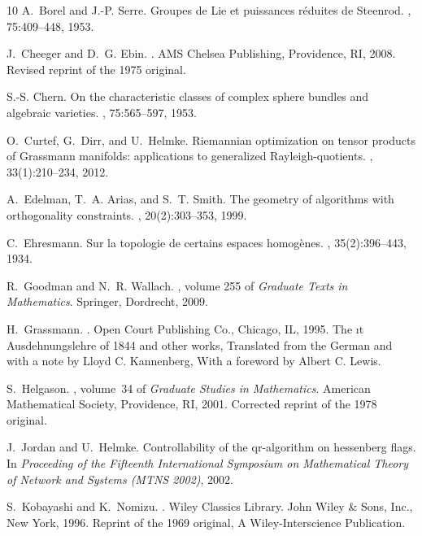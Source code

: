\documentclass[11pt,reqno]{amsart}%
\theoremstyle{definition}
\theoremstyle{remark}
\begin{document}
\begin{thebibliography}{10}
A.~Borel and J.-P. Serre.
\newblock Groupes de {L}ie et puissances r\'{e}duites de {S}teenrod.
, 75:409--448, 1953.

J.~Cheeger and D.~G. Ebin.
.
\newblock AMS Chelsea Publishing, Providence, RI, 2008.
\newblock Revised reprint of the 1975 original.

S.-S. Chern.
\newblock On the characteristic classes of complex sphere bundles and algebraic
  varieties.
, 75:565--597, 1953.

O.~Curtef, G.~Dirr, and U.~Helmke.
\newblock Riemannian optimization on tensor products of {G}rassmann manifolds:
  applications to generalized {R}ayleigh-quotients.
, 33(1):210--234, 2012.

A.~Edelman, T.~A. Arias, and S.~T. Smith.
\newblock The geometry of algorithms with orthogonality constraints.
, 20(2):303--353, 1999.

C.~Ehresmann.
\newblock Sur la topologie de certains espaces homog\`enes.
, 35(2):396--443, 1934.

R.~Goodman and N.~R. Wallach.
, volume 255 of {\em
  Graduate Texts in Mathematics}.
\newblock Springer, Dordrecht, 2009.

H.~Grassmann.
.
\newblock Open Court Publishing Co., Chicago, IL, 1995.
\newblock The {{\i}t Ausdehnungslehre} of 1844 and other works, Translated from
  the German and with a note by Lloyd C. Kannenberg, With a foreword by Albert
  C. Lewis.

S.~Helgason.
,
  volume~34 of {\em Graduate Studies in Mathematics}.
\newblock American Mathematical Society, Providence, RI, 2001.
\newblock Corrected reprint of the 1978 original.

J.~Jordan and U.~Helmke.
\newblock Controllability of the qr-algorithm on hessenberg flags.
\newblock In {\em Proceeding of the Fifteenth International Symposium on
  Mathematical Theory of Network and Systems (MTNS 2002)}, 2002.

S.~Kobayashi and K.~Nomizu.
.
\newblock Wiley Classics Library. John Wiley \& Sons, Inc., New York, 1996.
\newblock Reprint of the 1969 original, A Wiley-Interscience Publication.


\end{thebibliography}
\end{document}

